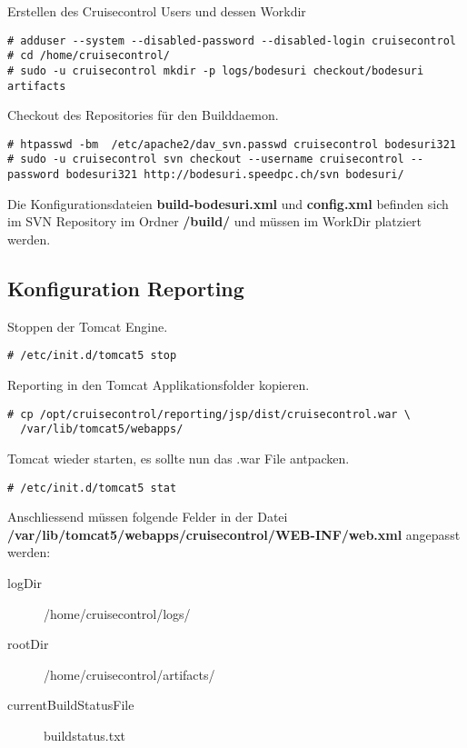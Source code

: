 \documentclass[12pt,halfparskip]{scrreprt}
\begin{document}
Erstellen des Cruisecontrol Users und dessen Workdir

\begin{verbatim}
# adduser --system --disabled-password --disabled-login cruisecontrol
# cd /home/cruisecontrol/
# sudo -u cruisecontrol mkdir -p logs/bodesuri checkout/bodesuri artifacts
\end{verbatim}

Checkout des Repositories für den Builddaemon. 

\begin{verbatim}
# htpasswd -bm  /etc/apache2/dav_svn.passwd cruisecontrol bodesuri321
# sudo -u cruisecontrol svn checkout --username cruisecontrol --password bodesuri321 http://bodesuri.speedpc.ch/svn bodesuri/
\end{verbatim}

Die Konfigurationsdateien \textbf{build-bodesuri.xml} und \textbf{config.xml} befinden sich im SVN Repository im Ordner \textbf{/build/} und müssen im WorkDir platziert werden.


\subsection{Konfiguration Reporting} %
\label{sub:konfiguration_reporting}

Stoppen der Tomcat Engine.

\begin{verbatim}
# /etc/init.d/tomcat5 stop
\end{verbatim}

Reporting in den Tomcat Applikationsfolder kopieren.

\begin{verbatim}
# cp /opt/cruisecontrol/reporting/jsp/dist/cruisecontrol.war \
  /var/lib/tomcat5/webapps/
\end{verbatim}

Tomcat wieder starten, es sollte nun das .war File antpacken.

\begin{verbatim}
# /etc/init.d/tomcat5 stat
\end{verbatim}

Anschliessend müssen folgende Felder in der Datei\newline
\textbf{/var/lib/tomcat5/webapps/cruisecontrol/WEB-INF/web.xml} angepasst werden:

\begin{description}
  \item[logDir] /home/cruisecontrol/logs/
  \item[rootDir] /home/cruisecontrol/artifacts/
  \item[currentBuildStatusFile] buildstatus.txt
\end{description}
\end{document}
